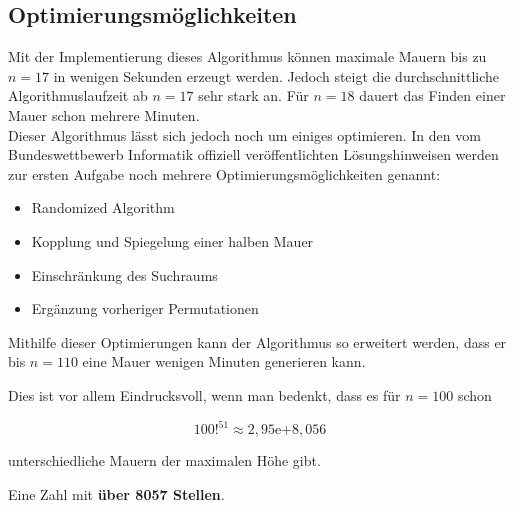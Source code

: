 \documentclass[a4paper,12pt]{article}
\begin{document}
\subsection{Optimierungsmöglichkeiten}
Mit der Implementierung dieses Algorithmus können maximale Mauern bis zu $n = 17$ in wenigen Sekunden erzeugt werden. Jedoch steigt die durchschnittliche Algorithmuslaufzeit ab $n = 17$ sehr stark an. Für $n = 18$ dauert das Finden einer Mauer schon mehrere Minuten.
\\[0.4cm]
Dieser Algorithmus lässt sich jedoch noch um einiges optimieren. In den vom Bundeswettbewerb Informatik offiziell veröffentlichten Lösungshinweisen werden zur ersten Aufgabe noch mehrere Optimierungsmöglichkeiten genannt:
\begin{itemize}
\item Randomized Algorithm
\item Kopplung und Spiegelung einer halben Mauer
\item Einschränkung des Suchraums
\item Ergänzung vorheriger Permutationen
\end{itemize}

Mithilfe dieser Optimierungen kann der Algorithmus so erweitert werden, dass er bis $n = 110$ eine Mauer wenigen Minuten generieren kann.

Dies ist vor allem Eindrucksvoll, wenn man bedenkt, dass es für $n = 100$ schon
\begin{center}
\begin{Large}
\[100!^{51} \approx 2,95\mathrm{e}{+8,056}\]
\end{Large}
\end{center}
unterschiedliche Mauern der maximalen Höhe gibt.

Eine Zahl mit \textbf{über 8057 Stellen}.
\end{document}
